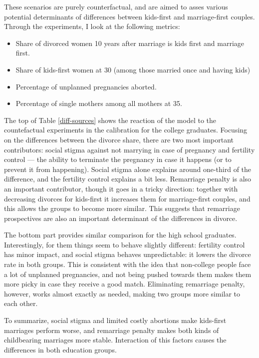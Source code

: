 \documentclass[12pt,letter]{article}
\begin{document}
These scenarios are purely counterfactual, and are aimed to asses various potential determinants of differences between kids-first and marriage-first couples. Through the experiments, I look at the following metrics:
\begin{itemize}
\item Share of divorced women 10 years after marriage is kids first and marriage first.
\item Share of kids-first women at 30 (among those married once and having kids)
\item Percentage of unplanned pregnancies aborted.
\item Percentage of single mothers among all mothers at 35.
\end{itemize}

The top of Table \ref{diff-sources} shows the reaction of the model to the countefactual experiments in the calibration for the college graduates. Focusing on the differences between the divorce share, there are two most important contributors: social stigma against not marrying in case of pregnancy and fertility control --- the ability to terminate the pregnancy in case it happens (or to prevent it from happening). Social stigma alone explains around one-third of the difference, and the fertility control explains a bit less. Remarriage penalty is also an important contributor, though it goes in a tricky direction: together with decreasing divorces for kids-first it increases them for marriage-first couples, and this allows the groups to become more similar. This suggests that remarriage prospectives are also an important determinant of the differences in divorce.

The bottom part provides similar comparison for the high school graduates. Interestingly, for them things seem to behave slightly different: fertility control has minor impact, and social stigma behaves unpredictable: it lowers the divorce rate in both groups. This is consistent with the idea that non-college people face a lot of unplanned pregnancies, and not being pushed towards them makes them more picky in case they receive a good match. Eliminating remarriage penalty, however, works almost exactly as needed, making two groups more similar to each other.

To summarize, social stigma and limited costly abortions make kids-first marriages perform worse, and remarriage penalty makes both kinds of childbearing marriages more stable. Interaction of this factors causes the differences in both education groups.
\end{document}
